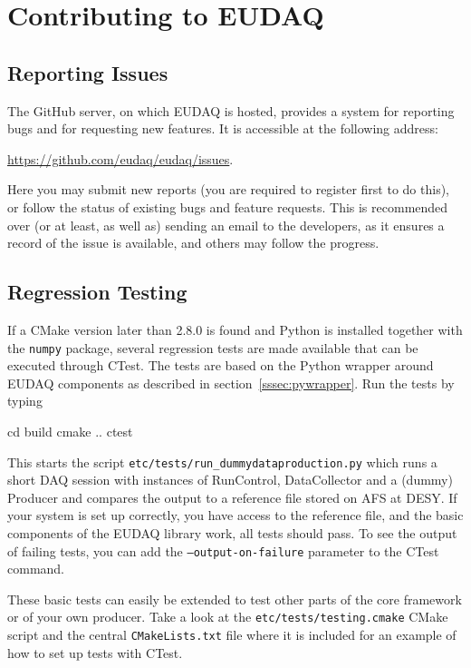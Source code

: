 \section{Contributing to EUDAQ}
\label{sec:contributing}

\subsection{Reporting Issues}
\label{sec:reporting}
The GitHub server, on which EUDAQ is hosted, provides a system for reporting bugs and for requesting new features.
It is accessible at the following address: 

\url{https://github.com/eudaq/eudaq/issues}.

Here you may submit new reports (you are required to register first to do this),
or follow the status of existing bugs and feature requests.
This is recommended over (or at least, as well as) sending an email to the developers,
as it ensures a record of the issue is available, and others may follow the progress.

\subsection{Regression Testing}
\label{sec:ctest}

If a CMake version later than 2.8.0 is found and Python is installed
together with the \texttt{numpy} package, several regression tests are made
available that can be executed through CTest. The tests are based on
the Python wrapper around EUDAQ components as described in
section~\ref{sssec:pywrapper}. Run the tests by typing

\begin{listing}[mybash]
  cd build
  cmake ..
  ctest
\end{listing}

This starts the script \texttt{etc/tests/run\_dummydataproduction.py}
which runs a short DAQ session with instances of RunControl,
DataCollector and a (dummy) Producer and compares the output to a
reference file stored on AFS at DESY. If your system is set up
correctly, you have access to the reference file, and the basic
components of the EUDAQ library work, all tests should pass.
To see the output of failing tests, you can add the
\texttt{--output-on-failure} parameter to the CTest command.

These basic tests can easily be extended to test other parts of the
core framework or of your own producer. Take a look at the
\texttt{etc/tests/testing.cmake} CMake script and the central
\texttt{CMakeLists.txt} file where it is included for an example of
how to set up tests with CTest.


